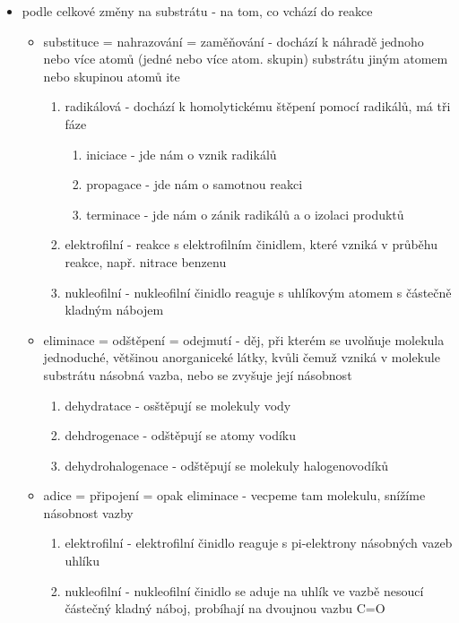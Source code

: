 \documentclass{article}
\begin{document}
\begin{itemize}
\begin{itemize}
\begin{itemize}
      \item podle celkové změny na substrátu - na tom, co vchází do reakce
      \begin{itemize}
        \item substituce = nahrazování = zaměňování - dochází k náhradě jednoho nebo více atomů (jedné nebo více atom. skupin) substrátu jiným atomem nebo skupinou atomů
        ite
        \begin{enumerate}
          \item radikálová - dochází k homolytickému štěpení pomocí radikálů, má tři fáze
            \begin{enumerate}
              \item iniciace - jde nám o vznik radikálů
              \item propagace - jde nám o samotnou reakci
              \item terminace - jde nám o zánik radikálů a o izolaci produktů
            \end{enumerate}
            \item elektrofilní - reakce s elektrofilním činidlem, které vzniká v průběhu reakce, např. nitrace benzenu
            \item nukleofilní - nukleofilní činidlo reaguje s uhlíkovým atomem s částečně kladným nábojem
        \end{enumerate}
        \item eliminace = odštěpení = odejmutí - děj, při kterém se uvolňuje molekula jednoduché, většinou anorganiceké látky, kvůli čemuž vzniká v molekule substrátu násobná vazba, nebo se zvyšuje její násobnost
        \begin{enumerate}
          \item dehydratace - osštěpují se molekuly vody
          \item dehdrogenace - odštěpují se atomy vodíku
          \item dehydrohalogenace - odštěpují se molekuly halogenovodíků
        \end{enumerate}
        \item adice = připojení = opak eliminace - vecpeme tam molekulu, snížíme násobnost vazby
        \begin{enumerate}
          \item elektrofilní - elektrofilní činidlo reaguje s pi-elektrony násobných vazeb uhlíku
          \item nukleofilní - nukleofilní činidlo se aduje na uhlík ve vazbě nesoucí částečný kladný náboj, probíhají na dvoujnou vazbu C=O

\end{enumerate}
\end{itemize}
\end{itemize}
\end{itemize}
\end{itemize}
\end{document}
